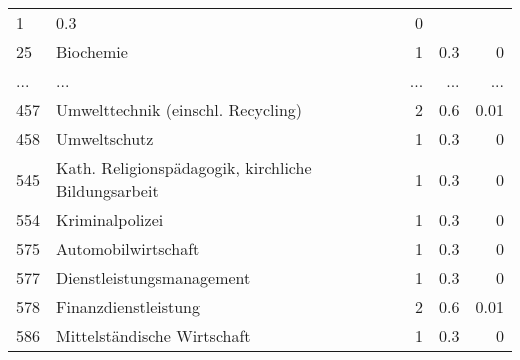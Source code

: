 \begin{longtable}{lXrrr}
          \num{1} &
          \num[round-mode=places,round-precision=2]{0,3} &
          \num[round-mode=places,round-precision=2]{0} \\
        25 & \multicolumn{1}{X}{Biochemie} & %
          \num{1} &
          \num[round-mode=places,round-precision=2]{0,3} &
          \num[round-mode=places,round-precision=2]{0} \\
       ... & ... & ... & ... & ... \\
        457 & \multicolumn{1}{X}{Umwelttechnik (einschl. Recycling)} & %
          \num{2} &
          \num[round-mode=places,round-precision=2]{0,6} &
          \num[round-mode=places,round-precision=2]{0,01} \\

        458 & \multicolumn{1}{X}{Umweltschutz} & %
          \num{1} &
          \num[round-mode=places,round-precision=2]{0,3} &
          \num[round-mode=places,round-precision=2]{0} \\

        545 & \multicolumn{1}{X}{Kath. Religionspädagogik, kirchliche Bildungsarbeit} & %
          \num{1} &
          \num[round-mode=places,round-precision=2]{0,3} &
          \num[round-mode=places,round-precision=2]{0} \\

        554 & \multicolumn{1}{X}{Kriminalpolizei} & %
          \num{1} &
          \num[round-mode=places,round-precision=2]{0,3} &
          \num[round-mode=places,round-precision=2]{0} \\

        575 & \multicolumn{1}{X}{Automobilwirtschaft} & %
          \num{1} &
          \num[round-mode=places,round-precision=2]{0,3} &
          \num[round-mode=places,round-precision=2]{0} \\

        577 & \multicolumn{1}{X}{Dienstleistungsmanagement} & %
          \num{1} &
          \num[round-mode=places,round-precision=2]{0,3} &
          \num[round-mode=places,round-precision=2]{0} \\

        578 & \multicolumn{1}{X}{Finanzdienstleistung} & %
          \num{2} &
          \num[round-mode=places,round-precision=2]{0,6} &
          \num[round-mode=places,round-precision=2]{0,01} \\

        586 & \multicolumn{1}{X}{Mittelständische Wirtschaft} & %
          \num{1} &
          \num[round-mode=places,round-precision=2]{0,3} &
          \num[round-mode=places,round-precision=2]{0} \\


\end{longtable}
